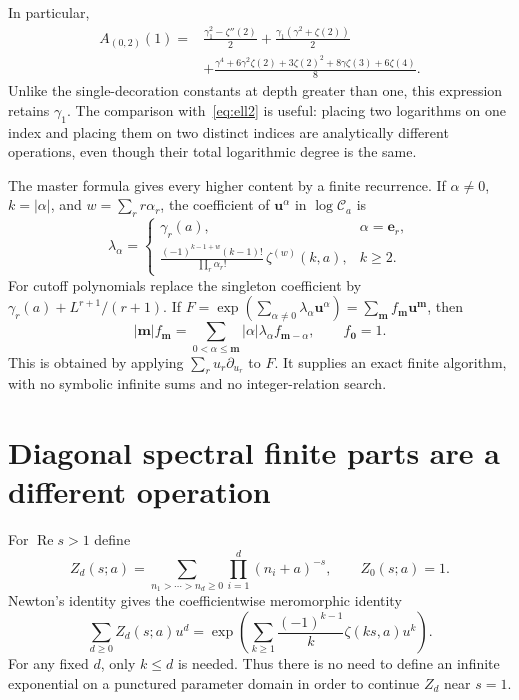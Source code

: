 \documentclass[11pt,oneside]{article}
\numberwithin{equation}{section}
\theoremstyle{definition}
\theoremstyle{remark}
\DeclareMathOperator{\Rea}{Re}
\newcommand{\uu}{\mathbf u}
\newcommand{\mm}{\mathbf m}
\newcommand{\ee}{\mathbf e}
\newcommand{\CC}{\mathcal C}
\begin{document}
In particular,
\begin{equation}\label{eq:two-example}
\begin{split}
A_{(0,2)}(1)={}&\frac{\gamma_1^2-\zeta''(2)}2
 +\frac{\gamma_1(\gamma^2+\zeta(2))}2\\
 &+\frac{\gamma^4+6\gamma^2\zeta(2)+3\zeta(2)^2
                  +8\gamma\zeta(3)+6\zeta(4)}8.
\end{split}
\end{equation}
Unlike the single-decoration constants at depth greater than one, this
expression retains $\gamma_1$. The comparison with~\eqref{eq:ell2} is useful:
placing two logarithms on one index and placing them on two distinct indices
are analytically different operations, even though their total logarithmic
degree is the same.

The master formula gives every higher content by a finite recurrence. If
$\alpha\ne0$, $k=|\alpha|$, and $w=\sum_r r\alpha_r$, the coefficient of
$\uu^\alpha$ in $\log\CC_a$ is
\begin{equation}\label{eq:log-multi-coefficient}
\lambda_\alpha=
\begin{cases}
\gamma_r(a),&\alpha=\ee_r,\\[2pt]
\displaystyle
\frac{(-1)^{k-1+w}(k-1)!}{\prod_r\alpha_r!}\,
             \zeta^{(w)}(k,a),&k\ge2.
\end{cases}
\end{equation}
For cutoff polynomials replace the singleton coefficient by
$\gamma_r(a)+L^{r+1}/(r+1)$. If $F=\exp(\sum_{\alpha\ne0}
\lambda_\alpha\uu^\alpha)=\sum_\mm f_\mm\uu^\mm$, then
\begin{equation}\label{eq:euler-recurrence}
|\mm|f_\mm=\sum_{0<\alpha\le\mm}|\alpha|\lambda_\alpha
                                         f_{\mm-\alpha},
\qquad f_{\mathbf0}=1.
\end{equation}
This is obtained by applying $\sum_r u_r\partial_{u_r}$ to $F$.
It supplies an exact finite algorithm, with no symbolic infinite sums and no
integer-relation search.

\section{Diagonal spectral finite parts are a different operation}
\label{sec:diagonal}

For $\Rea s>1$ define
\[
Z_d(s;a)=\sum_{n_1>\cdots>n_d\ge0}\prod_{i=1}^d(n_i+a)^{-s},
\qquad Z_0(s;a)=1.
\]
Newton's identity gives the coefficientwise meromorphic identity
\begin{equation}\label{eq:diagonal-generator}
\sum_{d\ge0}Z_d(s;a)u^d
=\exp\!\left(\sum_{k\ge1}\frac{(-1)^{k-1}}k\zeta(ks,a)u^k\right).
\end{equation}
For any fixed $d$, only $k\le d$ is needed. Thus there is no need to define an
infinite exponential on a punctured parameter domain in order to continue
$Z_d$ near $s=1$.
\end{document}
